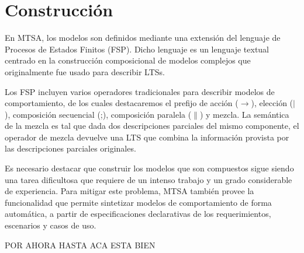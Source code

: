 \section{Construcción}

En MTSA, los modelos son definidos mediante una extensión del lenguaje de Procesos de Estados Finitos (FSP). Dicho
lenguaje es un lenguaje textual centrado en la construcción composicional de modelos complejos que originalmente fue
usado para describir LTSs.

Los FSP incluyen varios operadores tradicionales para describir modelos de comportamiento, de los cuales destacaremos el
prefijo de acción ($\rightarrow$), elección ($|$), composición secuencial (;), composición paralela ($\|$) y mezcla.
La semántica de la mezcla es tal que dada dos descripciones parciales del mismo componente, el operador de mezcla
devuelve una LTS que combina la información provista por las descripciones parciales originales.

Es necesario destacar que construir los modelos que son compuestos sigue siendo una tarea dificultosa que requiere de un
intenso trabajo y un grado considerable de experiencia. Para mitigar este problema, MTSA también provee la funcionalidad
que permite sintetizar modelos de comportamiento de forma automática, a partir de especificaciones declarativas de los
requerimientos, escenarios y casos de uso.

POR AHORA HASTA ACA ESTA BIEN
